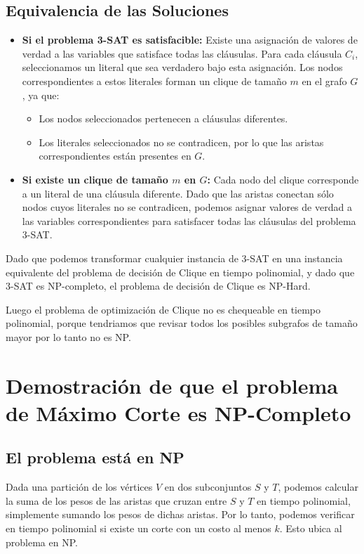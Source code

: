 \documentclass[12pt]{article}
\begin{document}
\subsection*{Equivalencia de las Soluciones}
\begin{itemize}
    \item \textbf{Si el problema 3-SAT es satisfacible:}
    Existe una asignación de valores de verdad a las variables que satisface todas las cláusulas. Para cada cláusula $C_i$, seleccionamos un literal que sea verdadero bajo esta asignación. Los nodos correspondientes a estos literales forman un clique de tamaño $m$ en el grafo $G$, ya que:
    \begin{itemize}
        \item Los nodos seleccionados pertenecen a cláusulas diferentes.
        \item Los literales seleccionados no se contradicen, por lo que las aristas correspondientes están presentes en $G$.
    \end{itemize}
    \item \textbf{Si existe un clique de tamaño $m$ en $G$:}
    Cada nodo del clique corresponde a un literal de una cláusula diferente. Dado que las aristas conectan sólo nodos cuyos literales no se contradicen, podemos asignar valores de verdad a las variables correspondientes para satisfacer todas las cláusulas del problema 3-SAT.
\end{itemize}

Dado que podemos transformar cualquier instancia de 3-SAT en una instancia equivalente del problema de decisión de Clique en tiempo polinomial, y dado que 3-SAT es NP-completo, el problema de decisión de Clique es NP-Hard.

Luego el problema de optimizaci\'on de Clique no es chequeable en tiempo polinomial, porque tendriamos que revisar todos los posibles subgrafos de tamaño mayor por lo tanto no es NP.

\section*{Demostración de que el problema de Máximo Corte es NP-Completo}

\subsection*{El problema está en NP}

Dada una partición de los vértices $V$ en dos subconjuntos $S$ y $T$, podemos calcular la suma de los pesos de las aristas que cruzan entre $S$ y $T$ en tiempo polinomial, simplemente sumando los pesos de dichas aristas. Por lo tanto, podemos verificar en tiempo polinomial si existe un corte con un costo al menos $k$. Esto ubica al problema en NP.
\end{document}
